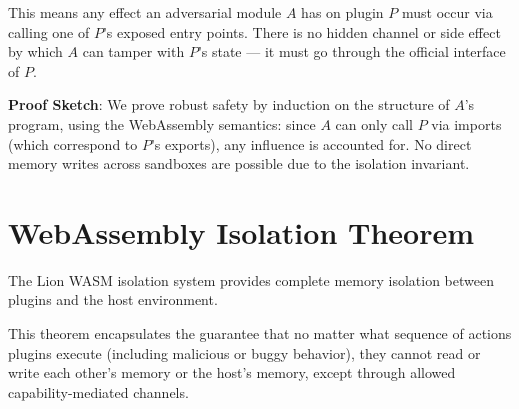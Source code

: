 This means any effect an adversarial module $A$ has on plugin $P$ must occur via calling one of $P$'s exposed entry points. There is no hidden channel or side effect by which $A$ can tamper with $P$'s state — it must go through the official interface of $P$.

\textbf{Proof Sketch}: We prove robust safety by induction on the structure of $A$'s program, using the WebAssembly semantics: since $A$ can only call $P$ via imports (which correspond to $P$'s exports), any influence is accounted for. No direct memory writes across sandboxes are possible due to the isolation invariant.

\newpage

\section{WebAssembly Isolation Theorem}

\begin{theorem}
The Lion WASM isolation system provides complete memory isolation between plugins and the host environment.
\end{theorem}

This theorem encapsulates the guarantee that no matter what sequence of actions plugins execute (including malicious or buggy behavior), they cannot read or write each other's memory or the host's memory, except through allowed capability-mediated channels.

